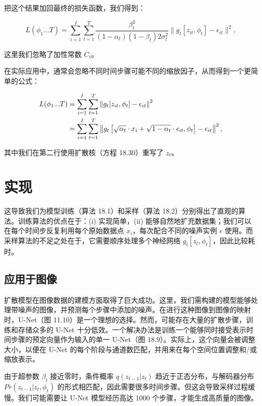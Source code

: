 \documentclass[lang=cn,newtx,10pt,scheme=chinese]{elegantbook}
\begin{document}
把这个结果加回最终的损失函数，我们得到：

\begin{equation}
L(\phi_1...T) = \sum_{i=1}^{I} \sum_{t=1}^{T} \frac{\beta_t^2}{(1 - \alpha_t)(1 - \beta_t)2\sigma_t^2} \| g_t[z_{it}, \phi_t] - \epsilon_{it} \|^2, 
\end{equation}

这里我们忽略了加性常数 \(C_i\)。

在实际应用中，通常会忽略不同时间步骤可能不同的缩放因子，从而得到一个更简单的公式：


\begin{align}
L(\phi_1...T) &= \sum_{i=1}^{I} \sum_{t=1}^{T} \left\| g_t[z_{it}, \phi_t] - \epsilon_{it} \right\|^2 \notag \\
&= \sum_{i=1}^{I} \sum_{t=1}^{T} \left\| g_t \left[ \sqrt{\alpha_t} \cdot x_i + \sqrt{1 - \alpha_t} \cdot \epsilon_{it}, \phi_t \right] - \epsilon_{it} \right\|^2,  
\end{align} 

其中我们在第二行使用扩散核（方程 18.30）重写了 \(z_t\)。

\section{实现}
这导致我们为模型训练（算法 18.1）和采样（算法 18.2）分别得出了直观的算法。训练算法的优点在于：(i) 实现简单，(ii) 能够自然地扩充数据集；我们可以在每个时间步反复利用每个原始数据点 \(x_i\)，每次配合不同的噪声实例 \(\epsilon\) 使用。而采样算法的不足之处在于，它需要顺序处理多个神经网络 \(g_t[z_t,\phi_t]\)，因此比较耗时。


\subsection{应用于图像}
扩散模型在图像数据的建模方面取得了巨大成功。这里，我们需构建的模型能够处理带噪声的图像，并预测每个步骤中添加的噪声。在进行这种图像到图像的映射时，U-Net（图 11.10）是一个理想的选择。然而，可能存在大量的扩散步骤，训练和存储众多的 U-Net 十分低效。一个解决办法是训练一个能够同时接受表示时间步骤的预定向量作为输入的单一 U-Net（图 18.9）。实际上，这个向量会被调整大小，以便在 U-Net 的每个阶段与通道数匹配，并用来在每个空间位置调整和/或缩放表示。

由于超参数 \(\beta_t\) 接近零时，条件概率 \(q(z_{t-1}|z_t)\) 趋近于正态分布，与解码器分布 \(Pr(z_{t-1}|z_t, \phi_t)\) 的形式相匹配，因此需要很多时间步骤。但这会导致采样过程缓慢。我们可能需要让 U-Net 模型经历高达 1000 个步骤，才能生成高质量的图像。
\end{document}
